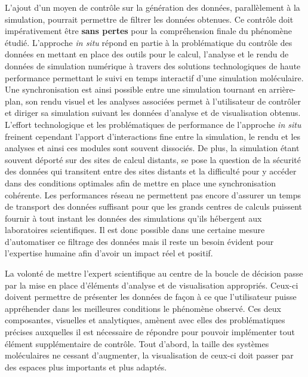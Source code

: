 L'ajout d'un moyen de contrôle sur la génération des données, parallèlement à la simulation, pourrait permettre de filtrer les données obtenues. Ce contrôle doit impérativement être \textbf{sans pertes} pour la compréhension finale du phénomène étudié. L'approche \textit{in situ} répond en partie à la problématique du contrôle des données en mettant en place des outils pour le calcul, l'analyse et le rendu de données de simulation numérique à travers des solutions technologiques de haute performance permettant le suivi en temps interactif d'une simulation moléculaire. Une synchronisation est ainsi possible entre une simulation tournant en arrière-plan, son rendu visuel et les analyses associées permet à l'utilisateur de contrôler et diriger sa simulation suivant les données d'analyse et de visualisation obtenus. L'effort technologique et les problématiques de performance de l'approche \textit{in situ} freinent cependant l'apport d'interactions fine entre la simulation, le rendu et les analyses et ainsi ces modules sont souvent dissociés. De plus, la simulation étant souvent déporté sur des sites de calcul distants, se pose la question de la sécurité des données qui transitent entre des sites distants et la difficulté pour y accéder dans des conditions optimales afin de mettre en place une synchronisation cohérente. Les performances réseau ne permettent pas encore d'assurer un temps de transport des données suffisant pour que les grands centres de calculs puissent fournir à tout instant les données des simulations qu'ils hébergent aux laboratoires scientifiques.
Il est donc possible dans une certaine mesure d'automatiser ce filtrage des données mais il reste un besoin évident pour l'expertise humaine afin d'avoir un impact réel et positif. 

La volonté de mettre l'expert scientifique au centre de la boucle de décision passe par la mise en place d'éléments d'analyse et de visualisation appropriés. Ceux-ci doivent permettre de présenter les données de façon à ce que l'utilisateur puisse appréhender dans les meilleures conditions le phénomène observé. Ces deux composantes, visuelles et analytiques, amènent avec elles des problématiques précises auxquelles il est nécessaire de répondre pour pouvoir implémenter tout élément supplémentaire de contrôle. Tout d'abord, la taille des systèmes moléculaires ne cessant d'augmenter, la visualisation de ceux-ci doit passer par des espaces plus importants et plus adaptés.

